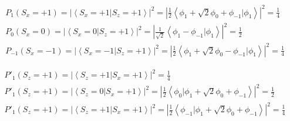 \begin{equation}\begin{split}
P_1\left(S_x=+1\right)=\left|\left\langle S_x=+1|S_z=+1 \right\rangle\right|^2=\left|\frac{1}{2}\left\langle \phi_1+\sqrt{2}\phi_0+\phi_{-1}|\phi_1 \right\rangle\right|^2=\frac{1}{4}\\
P_0\left(S_x=0\right)=\left|\left\langle S_x=0|S_z=+1 \right\rangle\right|^2=\left|\frac{1}{\sqrt{2}}\left\langle \phi_1-\phi_{-1}|\phi_1 \right\rangle\right|^2=\frac{1}{2}\\
P_{-1}\left(S_x=-1\right)=\left|\left\langle S_x=-1|S_z=+1 \right\rangle\right|^2=\left|\frac{1}{2}\left\langle \phi_1+\sqrt{2}\phi_0-\phi_{-1}|\phi_1 \right\rangle\right|^2=\frac{1}{4}
\end{split}\end{equation}

\begin{equation}\begin{split}
P'_1\left(S_z=+1\right)=\left|\left\langle S_z=+1|S_x=+1 \right\rangle\right|^2=\frac{1}{4}\\
P'_1\left(S_z=+1\right)=\left|\left\langle S_z=0|S_x=+1 \right\rangle\right|^2=\left|\frac{1}{2}\left\langle\phi_{0} |\phi_1+\sqrt{2}\phi_0+\phi_{-1} \right\rangle\right|^2=\frac{1}{2}\\
P'_1\left(S_z=+1\right)=\left|\left\langle S_z=+1|S_x=+1 \right\rangle\right|^2=\left|\frac{1}{2}\left\langle\phi_{-1} |\phi_1+\sqrt{2}\phi_0+\phi_{-1} \right\rangle\right|^2=\frac{1}{4}
\end{split}\end{equation}

